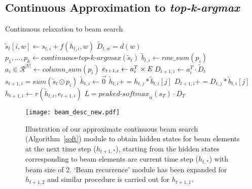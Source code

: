 \documentclass[letterpaper]{article} \usepackage{aaai18}  \usepackage{times}  \usepackage{helvet}  \usepackage{courier}  \usepackage{url}  \usepackage{graphicx}  \frenchspacing
\begin{document}
\subsection{Continuous Approximation to \textit{top-k-argmax} \label{soft-topk}}

\begin{algorithm*}[t]
\caption{Continuous relaxation to beam search}\label{soft}
\begin{algorithmic}[1]
 
\State $\tilde{s}_t[i,w] \gets s_{t,i} + f(h_{t,i},w)$ 
\EndFor
\State $\tilde{D}_{t,w} = d(w)$ 
\EndFor
 \State $p_1,\ldots,p_k \gets \textit{continuous-top-k-argmax}(\tilde{s}_t)$ 
  \State $\tilde{b}_{t,i} \gets \textit{row\_sum}(p_{i})$ 
  \State $a_i \in \mathcal{R}^{|V|} \gets \textit{column\_sum}(p_i)$ 
  \State $e_{t+1,i} \gets a_i^{T} \times \textit E$ 
  \State $D_{t+1,i} \gets a_i^{T} \cdot \tilde{D}_t$
  \State $s_{t+1,i} = \textit{sum}(\tilde{s}_t \odot p_i)$
\State $\tilde{h}_{t,i} \gets \vec{0}$
   
  \State $\tilde{h}_{t,i} += h_{t,j}*\tilde{b}_{t,i}[j]$
  \State $D_{t+1,i} += D_{t,j}*\tilde{b}_{t,i}[j]$
  \EndFor
  \State $h_{t+1,i} \gets r(\tilde{h}_{t,i},e_{t+1,i})$ 
 \EndFor
\EndFor
\State $L = \textit{peaked-softmax}_{\alpha}(s_T) \cdot D_{T}$ 
\end{algorithmic}
\end{algorithm*}
\begin{figure*}[t]
\centering
\texttt{[image: beam\_desc\_new.pdf]}
\label{figmodel}
  \caption{Illustration of our approximate continuous beam search (Algorithm~\ref{soft}) module to obtain hidden states for beam elements at the next time step (${h_{t+1,*}}$), starting from the hidden states corresponding to beam elements are current time step ($h_{t,*}$) with beam size of 2. `Beam recurrence' module has been expanded for $h_{t+1,2}$ and similar procedure is carried out for $h_{t+1,1}$.}
\end{figure*}
\end{document}
